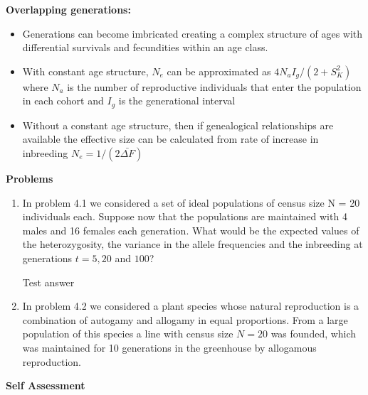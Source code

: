 \documentclass[12pt]{amsart}
\begin{document}
{\large \bf Overlapping generations:}
\begin{itemize}
\item Generations can become imbricated creating a complex structure of ages with differential survivals and fecundities within an age class. 
\item With constant age structure, $N_e$ can be approximated as $4N_aI_g / (2 + S_K^2)$ where $N_a$ is the number of reproductive individuals that enter the population in each cohort and $I_g$ is the generational interval
\item Without a constant age structure, then if genealogical relationships are available the effective size can be calculated from rate of increase in inbreeding $N_e = 1/(2\bar{\Delta F})$
\end{itemize}

{\large \bf Problems}   
\begin{enumerate}
\item In problem 4.1 we considered a set of ideal populations of census size N = 20 individuals each. Suppose now that the populations are maintained with 4 males and 16 females each generation. What would be the expected values of the heterozygosity, the variance in the allele frequencies and the inbreeding at generations $t = 5, 20$ and $100$?

Test answer

\item In problem 4.2 we considered a plant species whose natural reproduction is a combination of autogamy and allogamy in equal proportions. From a large population of this species a line with census size $N = 20$ was founded, which was maintained for 10 generations in the greenhouse by allogamous reproduction. 
\end{enumerate}


{\large \bf Self Assessment}


\medskip
\end{document}

